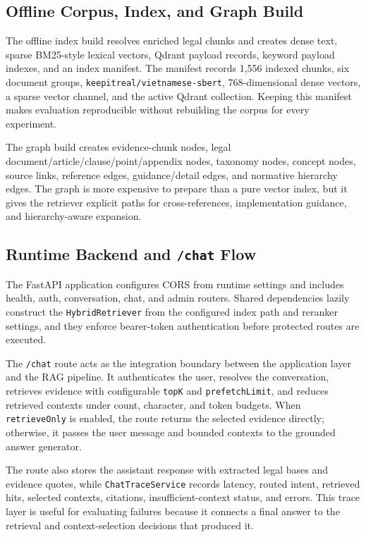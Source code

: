 
\subsection{Offline Corpus, Index, and Graph Build}
The offline index build resolves enriched legal chunks and creates dense text, sparse BM25-style lexical vectors, Qdrant payload records, keyword payload indexes, and an index manifest. The manifest records 1,556 indexed chunks, six document groups, \texttt{keepitreal/vietnamese-sbert}, 768-dimensional dense vectors, a sparse vector channel, and the active Qdrant collection. Keeping this manifest makes evaluation reproducible without rebuilding the corpus for every experiment.

The graph build creates evidence-chunk nodes, legal document/article/clause/point/appendix nodes, taxonomy nodes, concept nodes, source links, reference edges, guidance/detail edges, and normative hierarchy edges. The graph is more expensive to prepare than a pure vector index, but it gives the retriever explicit paths for cross-references, implementation guidance, and hierarchy-aware expansion.

\subsection{Runtime Backend and \texttt{/chat} Flow}
The FastAPI application configures CORS from runtime settings and includes health, auth, conversation, chat, and admin routers. Shared dependencies lazily construct the \texttt{HybridRetriever} from the configured index path and reranker settings, and they enforce bearer-token authentication before protected routes are executed.

The \texttt{/chat} route acts as the integration boundary between the application layer and the RAG pipeline. It authenticates the user, resolves the conversation, retrieves evidence with configurable \texttt{topK} and \texttt{prefetchLimit}, and reduces retrieved contexts under count, character, and token budgets. When \texttt{retrieveOnly} is enabled, the route returns the selected evidence directly; otherwise, it passes the user message and bounded contexts to the grounded answer generator.

The route also stores the assistant response with extracted legal bases and evidence quotes, while \texttt{ChatTraceService} records latency, routed intent, retrieved hits, selected contexts, citations, insufficient-context status, and errors. This trace layer is useful for evaluating failures because it connects a final answer to the retrieval and context-selection decisions that produced it.

